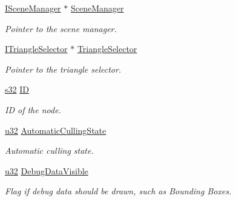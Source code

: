 \begin{DoxyCompactItemize}
\hyperlink{classirr_1_1scene_1_1ISceneManager}{I\+Scene\+Manager} $\ast$ \hyperlink{classirr_1_1scene_1_1ISceneNode_a062a201ee9b870398fe5aa8f36ce54a5}{Scene\+Manager}
\begin{DoxyCompactList}\small\item\em Pointer to the scene manager. \end{DoxyCompactList}\item 
\mbox{\label{classirr_1_1scene_1_1ISceneNode_ad622b3f366243e146b3b4cbe81b468ab}} 
\hyperlink{classirr_1_1scene_1_1ITriangleSelector}{I\+Triangle\+Selector} $\ast$ \hyperlink{classirr_1_1scene_1_1ISceneNode_ad622b3f366243e146b3b4cbe81b468ab}{Triangle\+Selector}
\begin{DoxyCompactList}\small\item\em Pointer to the triangle selector. \end{DoxyCompactList}\item 
\mbox{\label{classirr_1_1scene_1_1ISceneNode_a001b5cf9866fae4092b9b2cc89f3ebef}} 
\hyperlink{namespaceirr_ac66849b7a6ed16e30ebede579f9b47c6}{s32} \hyperlink{classirr_1_1scene_1_1ISceneNode_a001b5cf9866fae4092b9b2cc89f3ebef}{ID}
\begin{DoxyCompactList}\small\item\em ID of the node. \end{DoxyCompactList}\item 
\mbox{\label{classirr_1_1scene_1_1ISceneNode_a0906d6df682ef3b1cbbe117907c0b995}} 
\hyperlink{namespaceirr_a0416a53257075833e7002efd0a18e804}{u32} \hyperlink{classirr_1_1scene_1_1ISceneNode_a0906d6df682ef3b1cbbe117907c0b995}{Automatic\+Culling\+State}
\begin{DoxyCompactList}\small\item\em Automatic culling state. \end{DoxyCompactList}\item 
\mbox{\label{classirr_1_1scene_1_1ISceneNode_a223a66d82d1c56e5f3730aeb9f83589c}} 
\hyperlink{namespaceirr_a0416a53257075833e7002efd0a18e804}{u32} \hyperlink{classirr_1_1scene_1_1ISceneNode_a223a66d82d1c56e5f3730aeb9f83589c}{Debug\+Data\+Visible}
\begin{DoxyCompactList}\small\item\em Flag if debug data should be drawn, such as Bounding Boxes. \end{DoxyCompactList}\item 

\end{DoxyCompactItemize}
